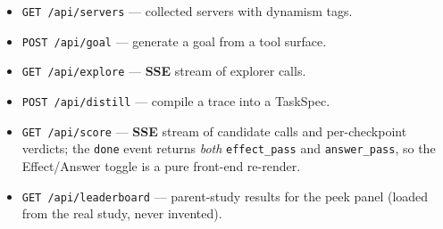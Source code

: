 \begin{itemize}\itemsep1pt
  \item \texttt{GET /api/servers} --- collected servers with dynamism tags.
  \item \texttt{POST /api/goal} --- generate a goal from a tool surface.
  \item \texttt{GET /api/explore} --- \textbf{SSE} stream of explorer calls.
  \item \texttt{POST /api/distill} --- compile a trace into a TaskSpec.
  \item \texttt{GET /api/score} --- \textbf{SSE} stream of candidate calls
    and per-checkpoint verdicts; the \texttt{done} event returns
    \emph{both} \texttt{effect\_pass} and \texttt{answer\_pass}, so the
    Effect/Answer toggle is a pure front-end re-render.
  \item \texttt{GET /api/leaderboard} --- parent-study results for the peek
    panel (loaded from the real study, never invented).
\end{itemize}
